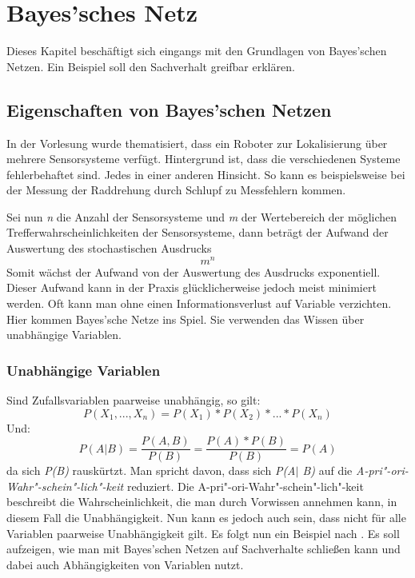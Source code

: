 \chapter{Bayes'sches Netz}
Dieses Kapitel beschäftigt sich eingangs mit den Grundlagen von Bayes'schen Netzen. Ein Beispiel soll den Sachverhalt greifbar erklären.

\section{Eigenschaften von Bayes'schen Netzen}
In der Vorlesung \cite{Strand17} wurde thematisiert, dass ein Roboter zur Lokalisierung über mehrere Sensorsysteme verfügt. Hintergrund ist, dass die verschiedenen Systeme fehlerbehaftet sind. Jedes in einer anderen Hinsicht. So kann es beispielsweise bei der Messung der Raddrehung durch Schlupf zu Messfehlern kommen.

Sei nun \textit{n} die Anzahl der Sensorsysteme und \textit{m} der Wertebereich der möglichen Trefferwahrscheinlichkeiten der Sensorsysteme, dann beträgt der Aufwand der Auswertung des stochastischen Ausdrucks \[ m^n\] Somit wächst der Aufwand von der Auswertung des Ausdrucks exponentiell. Dieser Aufwand kann in der Praxis glücklicherweise jedoch meist minimiert werden. Oft kann man ohne einen Informationsverlust auf Variable verzichten. Hier kommen Bayes'sche Netze ins Spiel. Sie verwenden das Wissen über unabhängige Variablen. 
\subsection{Unabhängige Variablen}
Sind Zufallsvariablen paarweise unabhängig, so gilt: \[ P(X_1, ..., X_n) = P(X_1) * P(X_2) * ... * P(X_n)\] 
Und: \[ P(A\vert B) = \frac{P(A,B)}{P(B)} = \frac{P(A) * P(B)}{P(B)}  = P(A) \] da sich \textit{P(B)} rauskürtzt. Man spricht davon, dass sich \textit{P(A$\vert$ B)} auf die \textit{A-pri"-ori-Wahr"-schein"-lich"-keit} reduziert. Die A-pri"-ori-Wahr"-schein"-lich"-keit beschreibt die Wahrscheinlichkeit, die man durch Vorwissen annehmen kann, in diesem Fall die Unabhängigkeit. Nun kann es jedoch auch sein, dass nicht für alle Variablen paarweise Unabhängigkeit gilt. Es folgt nun ein Beispiel nach \cite{Perl88}. Es soll aufzeigen, wie man mit Bayes'schen Netzen auf Sachverhalte schließen kann und dabei auch Abhängigkeiten von Variablen nutzt. 

